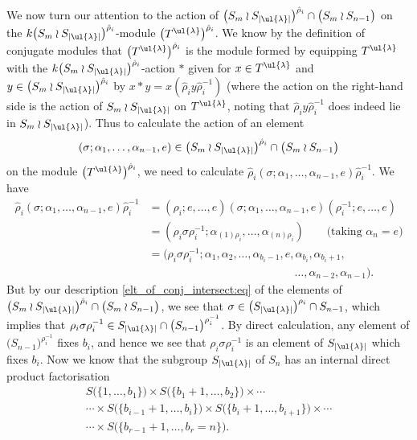 We now turn our attention to the action of
$\bigl(S_m \wr S_{|\ul{\lambda}|}\bigr)^{\hat\rho_i}\cap\bigl(S_m \wr S_{n-1}\bigr)$
on the
$k\bigl(S_m \wr S_{|\ul{\lambda}|}\bigr)^{\hat\rho_i}$-module $\left(T^{\ul{\lambda}}\right)^{\hat\rho_i}$.
We know by the definition of conjugate modules that $\left(T^{\ul{\lambda}}\right)^{\hat\rho_i}$ is the module formed by equipping
$T^{\ul{\lambda}}$ with the $k\bigl(S_m \wr S_{|\ul{\lambda}|}\bigr)^{\hat\rho_i}$-action $\ast$ given for $x \in T^{\ul{\lambda}}$ and
$y \in \bigl(S_m \wr S_{|\ul{\lambda}|}\bigr)^{\hat\rho_i}$ by $x \ast y = x (\hat\rho_iy\hat\rho_i^{-1})$ (where the action on the
right-hand side is the action of $S_m \wr S_{|\ul{\lambda}|}$ on $T^{\ul{\lambda}}$, noting that $\hat\rho_iy\hat\rho_i^{-1}$ does indeed
lie in $S_m \wr S_{|\ul{\lambda}|}$). Thus to calculate the action of an element
\[(\sigma;\alpha_1,\ldots,\alpha_{n-1},e) \in \bigl(S_m \wr S_{|\ul{\lambda}|}\bigr)^{\hat\rho_i}\cap\bigl(S_m \wr S_{n-1}\bigr)\]
on the module $\left(T^{\ul{\lambda}}\right)^{\hat\rho_i}$, we need to calculate
$\hat\rho_i(\sigma;\alpha_1,\ldots,\alpha_{n-1},e)\hat\rho_i^{-1}$. We have
\begin{align*}
\hat\rho_i(\sigma;\alpha_1,\ldots,\alpha_{n-1},e)\hat\rho_i^{-1}
&= (\rho_i;e,\ldots,e)(\sigma;\alpha_1,\ldots,\alpha_{n-1},e)(\rho_i^{-1};e,\ldots,e)\\
&= (\rho_i\sigma\rho_i^{-1};\alpha_{(1)\rho_i},\ldots,\alpha_{(n)\rho_i})\qquad \text{(taking $\alpha_n = e$)}\\
&= (\rho_i\sigma\rho_i^{-1};\alpha_1,\alpha_2,\ldots,\alpha_{b_i-1},e,\alpha_{b_i},\alpha_{b_i+1},\\
&\hspace{13em}\ldots,\alpha_{n-2},\alpha_{n-1}).
\end{align*}
But by our description \eqref{elt_of_conj_intersect:eq} of the elements of
$\bigl(S_m \wr S_{|\ul{\lambda}|}\bigr)^{\hat\rho_i}\cap\bigl(S_m \wr S_{n-1}\bigr)$, we see that
$\sigma \in \bigl(S_{|\ul{\lambda}|}\bigr)^{\rho_i}\cap S_{n-1}$, which implies that
$\rho_i\sigma\rho_i^{-1} \in S_{|\ul{\lambda}|}\cap \bigl(S_{n-1}\bigr)^{\rho^{-1}_i}$. By direct calculation, any element of
$\bigl(S_{n-1}\bigr)^{\rho^{-1}_i}$ fixes $b_i$, and hence we see that $\rho_i\sigma\rho_i^{-1}$ is an element of
$S_{|\ul{\lambda}|}$ which fixes $b_i$.
Now we know that the subgroup $S_{|\ul{\lambda}|}$ of $S_n$ has an internal direct product factorisation
\begin{multline*}
S\bigl(\{1,\ldots,b_1\}\bigr) \times S\bigl(\{b_1+1,\ldots,b_2\}\bigr) \times \cdots\\
\cdots\times S\bigl(\{b_{i-1}+1,\ldots,b_i\}\bigr)\times S\bigl(\{b_i+1,\ldots,b_{i+1}\}\bigr)\times\cdots\\
\cdots \times S\bigl(\{b_{r-1}+1,\ldots,b_r = n\}\bigr).
\end{multline*}

